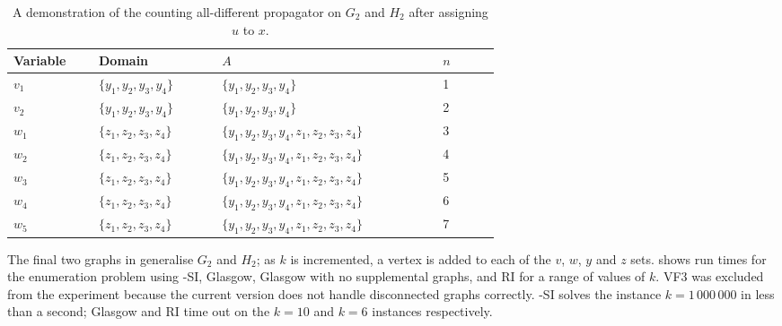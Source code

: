 \begin{table}[h!]
\centering
\footnotesize
    \begin{tabular}{p{0.09\linewidth} p{0.16\linewidth} p{0.3\linewidth} p{0.08\linewidth}}
 \toprule
     Variable & Domain & $A$ & $n$\\ [0.5ex]
 \midrule
     $v_1$ & $\{y_1,y_2,y_3,y_4\}$ & $\{y_1,y_2,y_3,y_4\}$ & 1\\
     $v_2$ & $\{y_1,y_2,y_3,y_4\}$ & $\{y_1,y_2,y_3,y_4\}$ & 2\\
     $w_1$ & $\{z_1,z_2,z_3,z_4\}$ & $\{y_1,y_2,y_3,y_4,z_1,z_2,z_3,z_4\}$ & 3\\
     $w_2$ & $\{z_1,z_2,z_3,z_4\}$ & $\{y_1,y_2,y_3,y_4,z_1,z_2,z_3,z_4\}$ & 4\\
     $w_3$ & $\{z_1,z_2,z_3,z_4\}$ & $\{y_1,y_2,y_3,y_4,z_1,z_2,z_3,z_4\}$ & 5\\
     $w_4$ & $\{z_1,z_2,z_3,z_4\}$ & $\{y_1,y_2,y_3,y_4,z_1,z_2,z_3,z_4\}$ & 6\\
     $w_5$ & $\{z_1,z_2,z_3,z_4\}$ & $\{y_1,y_2,y_3,y_4,z_1,z_2,z_3,z_4\}$ & 7\\
 \bottomrule
\end{tabular}
\caption{A demonstration of the counting all-different propagator on $G_2$ and $H_2$
    after assigning $u$ to $x$.}
\label{tab:counting-all-diff}
\end{table}

The final two graphs in  generalise $G_2$ and $H_2$; as $k$ is incremented,
a vertex is added to each of the $v$, $w$, $y$ and $z$ sets.
 shows run times for the enumeration problem
using \McSplit-SI, Glasgow, Glasgow with no supplemental graphs, and RI for a range of values of $k$.
VF3 was excluded from the experiment because the current version does not handle disconnected graphs correctly.
\McSplit-SI solves the instance $k=1\,000\,000$ in less than a second;
Glasgow and RI time out on the $k=10$ and $k=6$ instances respectively.


